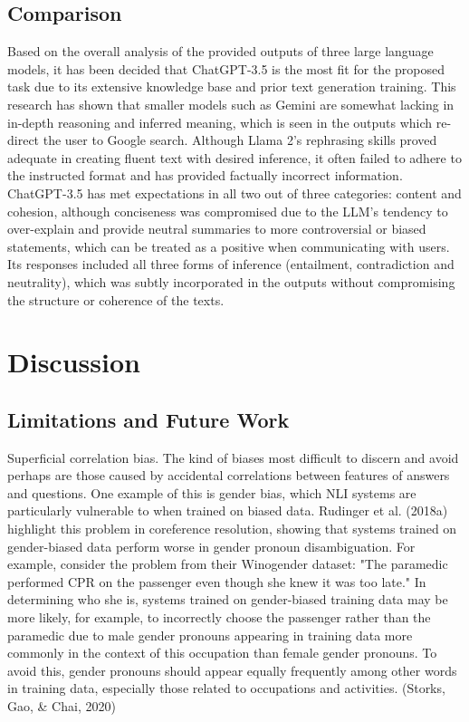 \documentclass[fleqn,moreauthors,10pt]{ds_report}
\begin{document}
\subsection*{Comparison}
Based on the overall  analysis of the provided outputs of three large language models, it has been decided that ChatGPT-3.5 is the most fit for the proposed task due to its extensive knowledge base and prior text generation training. This research has shown that smaller models such as Gemini are somewhat lacking in in-depth reasoning and inferred meaning, which is seen in the outputs which re-direct the user to Google search. Although Llama 2’s rephrasing skills proved adequate in creating fluent text with desired inference, it often failed to adhere to the instructed format and has provided factually incorrect information. ChatGPT-3.5 has met expectations in all two out of three categories: content and cohesion, although conciseness was compromised due to the LLM’s tendency to over-explain and provide neutral summaries to more controversial or biased statements, which can be treated as a positive when communicating with users. Its responses included all three forms of inference (entailment, contradiction and neutrality), which was subtly incorporated in the outputs without compromising the structure or coherence of the texts.

\section*{Discussion}

\subsection*{Limitations and Future Work}

Superficial correlation bias. The kind of biases most difficult to discern and avoid perhaps are those caused by accidental correlations between features of answers and questions. One example of this is gender bias, which NLI systems are particularly vulnerable to when trained on biased data. Rudinger et al. (2018a) highlight this problem in coreference resolution, showing that systems trained on gender-biased data perform worse in gender pronoun disambiguation. For example, consider the problem from their Winogender dataset: "The paramedic performed CPR on the passenger even though she knew it was too late." In determining who she is, systems trained on gender-biased training data may be more likely, for example, to incorrectly choose the passenger rather than the paramedic due to male gender pronouns appearing in training data more commonly in the context of this occupation than female gender pronouns. To avoid this, gender pronouns should appear equally frequently among other words in training data, especially those related to occupations and activities. (Storks, Gao, \& Chai, 2020)
\end{document}
